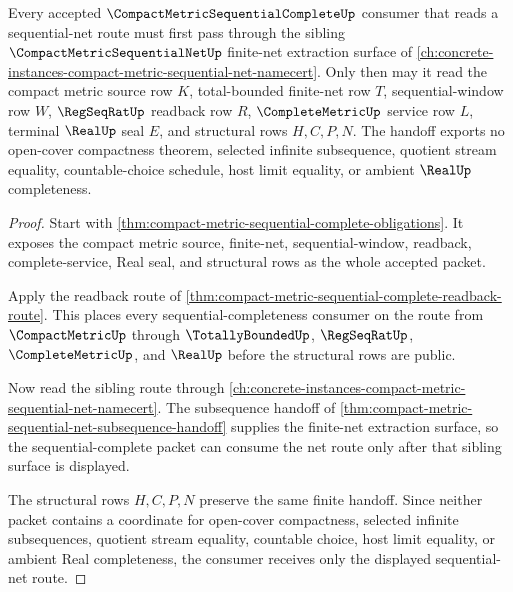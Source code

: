 \begin{theorem}
\label{thm:compact-metric-sequential-complete-net-handoff}
Every accepted $\CompactMetricSequentialCompleteUp$ consumer that reads a sequential-net route must first pass through the sibling $\CompactMetricSequentialNetUp$ finite-net extraction surface of \autoref{ch:concrete-instances-compact-metric-sequential-net-namecert}. Only then may it read the compact metric source row $K$, total-bounded finite-net row $T$, sequential-window row $W$, $\RegSeqRatUp$ readback row $R$, $\CompleteMetricUp$ service row $L$, terminal $\RealUp$ seal $E$, and structural rows $H,C,P,N$. The handoff exports no open-cover compactness theorem, selected infinite subsequence, quotient stream equality, countable-choice schedule, host limit equality, or ambient $\RealUp$ completeness.
\end{theorem}
\begin{proof}
Start with \autoref{thm:compact-metric-sequential-complete-obligations}. It exposes the compact metric source, finite-net, sequential-window, readback, complete-service, Real seal, and structural rows as the whole accepted packet.

Apply the readback route of \autoref{thm:compact-metric-sequential-complete-readback-route}. This places every sequential-completeness consumer on the route from $\CompactMetricUp$ through $\TotallyBoundedUp$, $\RegSeqRatUp$, $\CompleteMetricUp$, and $\RealUp$ before the structural rows are public.

Now read the sibling route through \autoref{ch:concrete-instances-compact-metric-sequential-net-namecert}. The subsequence handoff of \autoref{thm:compact-metric-sequential-net-subsequence-handoff} supplies the finite-net extraction surface, so the sequential-complete packet can consume the net route only after that sibling surface is displayed.

The structural rows $H,C,P,N$ preserve the same finite handoff. Since neither packet contains a coordinate for open-cover compactness, selected infinite subsequences, quotient stream equality, countable choice, host limit equality, or ambient Real completeness, the consumer receives only the displayed sequential-net route.
\end{proof}


